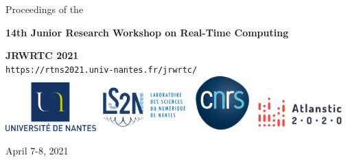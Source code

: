 \documentclass[10pt]{article}
\newcommand\blankpage{%
	\null
	\thispagestyle{empty}%
	\addtocounter{page}{-1}%
	\newpage}
\begin{document}


\begin{center}
	\thispagestyle{empty}
	\LARGE{Proceedings of the}\\[-0.9ex]
	\vspace{0.1cm}
	\begin{center}

		\vspace{0.1cm}
		\textbf{\LARGE{14th Junior Research Workshop on Real-Time Computing}}
		\bigskip\par

		\textbf{\LARGE{JRWRTC 2021}}\\
		\vspace{0.3cm}
		\large{\texttt{https://rtns2021.univ-nantes.fr/jrwrtc/}}\\[-0.5ex]
		\vspace{1cm}
		\includegraphics[width=3.5cm]{imgs/logo-un-768x413.png}
		\includegraphics[width=3.5cm]{imgs/LOGOS-LS2N-e1602231001594-768x400.png}
		\includegraphics[width=2.2cm]{imgs/cnrs-3-e1612193794303.png}
		\includegraphics[width=3.5cm]{imgs/image.png}

		\vspace{1cm}
		
		\large{April 7-8, 2021}\\[-1ex]
		\vspace{0.6cm}
		
	\end{center}
	\medskip
\end{center}
\afterpage{\null\blankpage}
\end{document}
